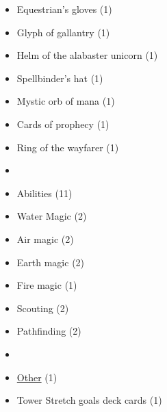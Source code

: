 \begin{multicols}{3}
\begin{itemize}[leftmargin=0pt, label={}, noitemsep, noitemsep]
  \item Equestrian's gloves (1)
  \item Glyph of gallantry (1)
  \item Helm of the alabaster unicorn (1)
  \item Spellbinder's hat (1)
  \item Mystic orb of mana (1)
  \item Cards of prophecy (1)
  \item Ring of the wayfarer (1)
  \item
  \item Abilities (11)
  \item Water Magic (2)
  \item Air magic (2)
  \item Earth magic (2)
  \item Fire magic (1)
  \item Scouting (2)
  \item Pathfinding (2)
  \item
  \item \underline{Other} (1)
  \item Tower Stretch goals deck cards (1)
\end{itemize}

\end{multicols}
